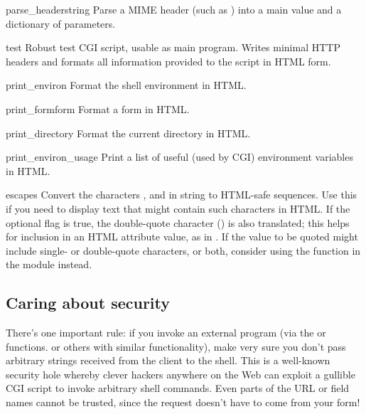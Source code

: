 \begin{funcdesc}{parse_header}{string}
Parse a MIME header (such as ) into a main
value and a dictionary of parameters.
\end{funcdesc}

\begin{funcdesc}{test}{}
Robust test CGI script, usable as main program.
Writes minimal HTTP headers and formats all information provided to
the script in HTML form.
\end{funcdesc}

\begin{funcdesc}{print_environ}{}
Format the shell environment in HTML.
\end{funcdesc}

\begin{funcdesc}{print_form}{form}
Format a form in HTML.
\end{funcdesc}

\begin{funcdesc}{print_directory}{}
Format the current directory in HTML.
\end{funcdesc}

\begin{funcdesc}{print_environ_usage}{}
Print a list of useful (used by CGI) environment variables in
HTML.
\end{funcdesc}

\begin{funcdesc}{escape}{s}
Convert the characters
\character{\&}, \character{<} and \character{>} in string  to
HTML-safe sequences.  Use this if you need to display text that might
contain such characters in HTML.  If the optional flag  is
true, the double-quote character () is also translated;
this helps for inclusion in an HTML attribute value, as in .  If the value to be quoted might include single- or
double-quote characters, or both, consider using the
 function in the 
module instead.
\end{funcdesc}


\subsection{Caring about security \label{cgi-security}}


There's one important rule: if you invoke an external program (via the
 or  functions. or others
with similar functionality), make very sure you don't pass arbitrary
strings received from the client to the shell.  This is a well-known
security hole whereby clever hackers anywhere on the Web can exploit a
gullible CGI script to invoke arbitrary shell commands.  Even parts of
the URL or field names cannot be trusted, since the request doesn't
have to come from your form!

